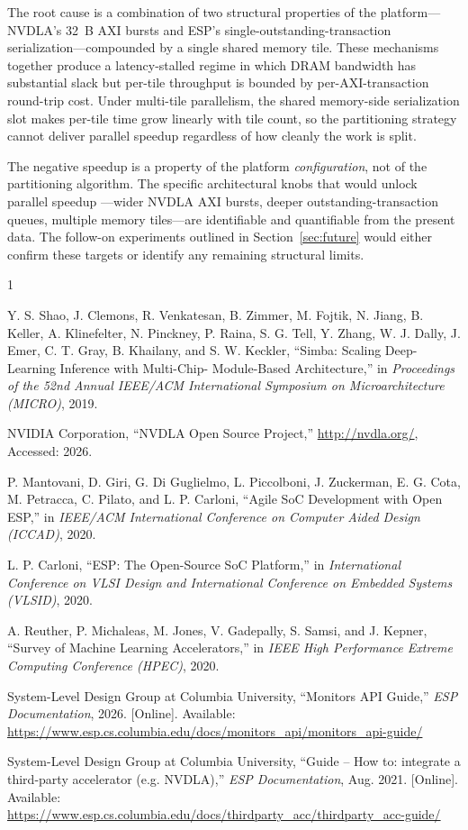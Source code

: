 \documentclass[10pt,sigconf,nonacm]{acmart}
\begin{document}
The root cause is a combination of two structural properties of
the platform---NVDLA's 32~B AXI bursts and ESP's
single-outstanding-transaction serialization---compounded by a
single shared memory tile. These mechanisms together produce a
latency-stalled regime in which DRAM bandwidth has substantial
slack but per-tile throughput is bounded by per-AXI-transaction
round-trip cost. Under multi-tile parallelism, the shared
memory-side serialization slot makes per-tile time grow linearly
with tile count, so the partitioning strategy cannot deliver
parallel speedup regardless of how cleanly the work is split.

The negative speedup is a property of the platform
\emph{configuration}, not of the partitioning algorithm. The
specific architectural knobs that would unlock parallel speedup
---wider NVDLA AXI bursts, deeper outstanding-transaction queues,
multiple memory tiles---are identifiable and quantifiable from
the present data. The follow-on experiments outlined in
Section~\ref{sec:future} would either confirm these targets or
identify any remaining structural limits.


\begin{thebibliography}{1}

Y. S. Shao, J. Clemons, R. Venkatesan, B. Zimmer, M. Fojtik, N. Jiang,
B. Keller, A. Klinefelter, N. Pinckney, P. Raina, S. G. Tell, Y.
Zhang, W. J. Dally, J. Emer, C. T. Gray, B. Khailany, and S. W.
Keckler, ``Simba: Scaling Deep-Learning Inference with Multi-Chip-
Module-Based Architecture,'' in \emph{Proceedings of the 52nd
Annual IEEE/ACM International Symposium on Microarchitecture
(MICRO)}, 2019.

NVIDIA Corporation, ``NVDLA Open Source Project,''
\url{http://nvdla.org/}, Accessed: 2026.

P. Mantovani, D. Giri, G. Di Guglielmo, L. Piccolboni, J. Zuckerman,
E. G. Cota, M. Petracca, C. Pilato, and L. P. Carloni, ``Agile SoC
Development with Open ESP,'' in \emph{IEEE/ACM International
Conference on Computer Aided Design (ICCAD)}, 2020.

L. P. Carloni, ``ESP: The Open-Source SoC Platform,'' in
\emph{International Conference on VLSI Design and International
Conference on Embedded Systems (VLSID)}, 2020.

A. Reuther, P. Michaleas, M. Jones, V. Gadepally, S. Samsi, and J.
Kepner, ``Survey of Machine Learning Accelerators,'' in \emph{IEEE
High Performance Extreme Computing Conference (HPEC)}, 2020.

System-Level Design Group at Columbia University, ``Monitors API
Guide,'' \emph{ESP Documentation}, 2026. [Online]. Available:
\url{https://www.esp.cs.columbia.edu/docs/monitors_api/monitors_api-guide/}

System-Level Design Group at Columbia University, ``Guide -- How
to: integrate a third-party accelerator (e.g. NVDLA),''
\emph{ESP Documentation}, Aug. 2021. [Online]. Available:
\url{https://www.esp.cs.columbia.edu/docs/thirdparty_acc/thirdparty_acc-guide/}

\end{thebibliography}
\end{document}
